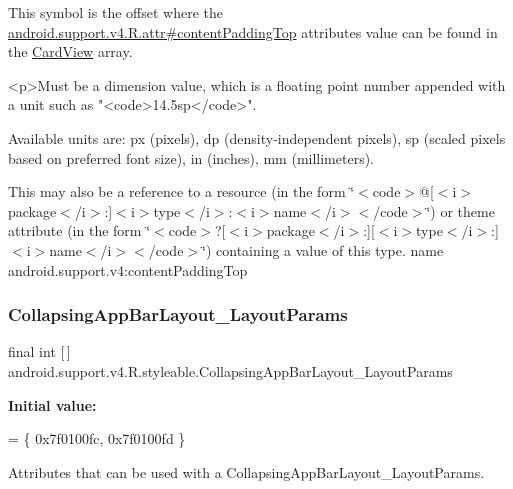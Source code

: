 This symbol is the offset where the \hyperlink{classandroid_1_1support_1_1v4_1_1R_1_1attr_a01bcbd68cfb27fa9bff4ff401c9174de}{android.\+support.\+v4.\+R.\+attr\#content\+Padding\+Top} attribute\textquotesingle{}s value can be found in the \hyperlink{classandroid_1_1support_1_1v4_1_1R_1_1styleable_a0e520cd4c78beb0d456e4018c4ba0e86}{Card\+View} array.

\begin{DoxyVerb}      <p>Must be a dimension value, which is a floating point number appended with a unit such as "<code>14.5sp</code>".
\end{DoxyVerb}
 Available units are\+: px (pixels), dp (density-\/independent pixels), sp (scaled pixels based on preferred font size), in (inches), mm (millimeters). 

This may also be a reference to a resource (in the form \char`\"{}$<$code$>$@\mbox{[}$<$i$>$package$<$/i$>$\+:\mbox{]}$<$i$>$type$<$/i$>$\+:$<$i$>$name$<$/i$>$$<$/code$>$\char`\"{}) or theme attribute (in the form \char`\"{}$<$code$>$?\mbox{[}$<$i$>$package$<$/i$>$\+:\mbox{]}\mbox{[}$<$i$>$type$<$/i$>$\+:\mbox{]}$<$i$>$name$<$/i$>$$<$/code$>$\char`\"{}) containing a value of this type.  name android.\+support.\+v4\+:content\+Padding\+Top \mbox{\label{classandroid_1_1support_1_1v4_1_1R_1_1styleable_a0696d62845b5e876d66afb6909f133af}} 
\subsubsection{\texorpdfstring{Collapsing\+App\+Bar\+Layout\+\_\+\+Layout\+Params}{CollapsingAppBarLayout\_LayoutParams}}
{\footnotesize\ttfamily final int \mbox{[}$\,$\mbox{]} android.\+support.\+v4.\+R.\+styleable.\+Collapsing\+App\+Bar\+Layout\+\_\+\+Layout\+Params\hspace{0.3cm}{\ttfamily [static]}}

{\bfseries Initial value\+:}
\begin{DoxyCode}
= \{
            0x7f0100fc, 0x7f0100fd
        \}
\end{DoxyCode}
Attributes that can be used with a Collapsing\+App\+Bar\+Layout\+\_\+\+Layout\+Params. 

